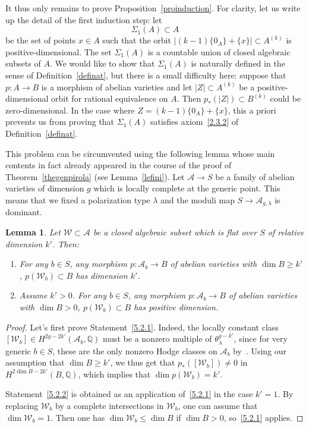 \documentclass[11pt]{article}
\newtheorem{lemm}[theo]{Lemma}
\theoremstyle{definition}
\numberwithin{equation}{section}
\numberwithin{figure}{section}
\numberwithin{table}{section}
\begin{document}
It thus only remains to prove Proposition~\ref{proinduction}. For clarity, let us write up the detail of the first induction step: let
\begin{equation}\label{eqnomsigma1}
\Sigma_1(A)\subset A
\end{equation}
be the set of points $x\in A$ such that the orbit $|(k-1)\{0_A\}+\{x\}|\subset A^{(k)}$ is positive-dimensional. The set $\Sigma_1(A)$ is a countable union of closed algebraic subsets of $A$. We would like to show that $\Sigma_1(A)$ is naturally defined in the sense of Definition~\ref{definat}, but there is a small difficulty here: suppose that $p:A\rightarrow B$ is a morphism of abelian varieties and let $|Z|\subset A^{(k)} $ be a positive-dimensional orbit for rational equivalence on $A$. Then $p_*(|Z|)\subset B^{(k)} $ could be zero-dimensional. In the case where $Z=(k-1)\{0_A\}+\{x\}$, this a priori prevents us from proving that $\Sigma_1(A)$ satisfies axiom~\eqref{2.3.2} of Definition~\ref{definat}.

This problem can be circumvented using the following lemma whose main contents in fact already appeared in the course of the proof of Theorem~\ref{thegenpirola} (see Lemma~\ref{lefini}). Let $\mathcal{A}\rightarrow S$ be a family of abelian varieties of dimension $g$ which is locally complete at the generic point. This means that we fixed a polarization type $\lambda$ and the moduli map $S\rightarrow\mathcal{A}_{g,\lambda}$ is dominant.

\begin{lemm}\label{generic}
Let $\mathcal{W}\subset \mathcal{A}$ be a closed algebraic subset which is
flat over $S$ of relative dimension $k'$. Then:
\begin{enumerate}
\item \label{5.2.1} For any $b\in S$, any morphism $p: \mathcal{A}_b\rightarrow B$ of abelian varieties with $\dim B\geq k'$, $p(\mathcal{W}_b)\subset B$ has dimension $k'$.
\item \label{5.2.2} Assume $k'>0$. For any $b\in S$, any morphism $p: \mathcal{A}_b\rightarrow B$ of abelian varieties with $\dim B>0$, $p(\mathcal{W}_b)\subset B$ has positive dimension.
\end{enumerate}
\end{lemm}

\begin{proof}
Let's first prove Statement~\eqref{5.2.1}. Indeed, the locally constant class $[\mathcal{W}_b]\in H^{2g-2k'}(\mathcal{A}_b,\mathbb{Q})$ must be a nonzero multiple of $\theta_\lambda^{g-k'}$, since for very generic $b\in S$, these are the only nonzero Hodge classes on $\mathcal{A}_b$ by~\cite{mattuck}. Using our assumption that $\dim B\geq k'$, we thus get that $p_*([\mathcal{W}_b])\not=0$ in $H^{2\dim B-2k'}(B,\mathbb{Q})$, which implies that $\dim p(\mathcal{W}_b)=k'$.

Statement~\eqref{5.2.2} is obtained as an application of~\eqref{5.2.1} in the case $k'=1$. By replacing $\mathcal{W}_b$ by a complete intersections in $\mathcal{W}_b$, one can assume that $\dim \mathcal{W}_b=1$. Then one has $\dim \mathcal{W}_b\leq\dim B$ if $\dim B>0$, so~\eqref{5.2.1} applies.
\end{proof}
\end{document}
